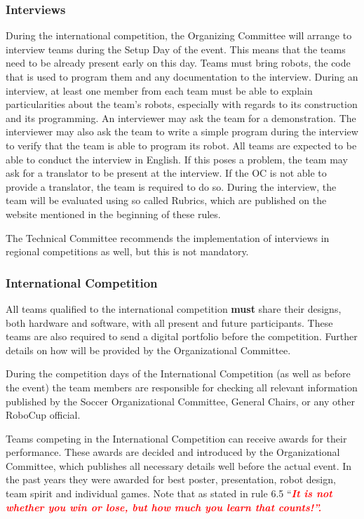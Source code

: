 \documentclass{article}
\begin{document}
\subsubsection{Interviews \label{ref-060}}

During the international competition, the Organizing Committee will arrange to interview teams during the Setup Day of the event. This means that the teams need to be already present early on this day. Teams must bring robots, the code that is used to program them and any documentation to the interview. During an interview, at least one member from each team must be able to explain particularities about the team's robots, especially with regards to its construction and its programming. An interviewer may ask the team for a demonstration. The interviewer may also ask the team to write a simple program during the interview to verify that the team is able to program its robot. All teams are expected to be able to conduct the interview in English. If this poses a problem, the team may ask for a translator to be present at the interview. If the OC is not able to provide a translator, the team is required to do so. During the interview, the team will be evaluated using so called Rubrics, which are published on the website mentioned in the beginning of these rules.

The Technical Committee recommends the implementation of interviews in regional competitions as well, but this is not mandatory.

\subsubsection{International Competition \label{ref-061}}

All teams qualified to the international competition \textbf{must} share their designs, both hardware and software, with all present and future participants. These teams are also required to send a digital portfolio before the competition. Further details on how will be provided by the Organizational Committee.

During the competition days of the International Competition (as well as before the event) the team members are responsible for checking all relevant information published by the Soccer Organizational Committee, General Chairs, or any other RoboCup official.

Teams competing in the International Competition can receive awards for their performance. These awards are decided and introduced by the Organizational Committee, which publishes all necessary details well before the actual event. In the past years they were awarded for best poster, presentation, robot design, team spirit and individual games. Note that as stated in rule 6.5 ``\textbf{\textit{\textcolor{red}{It is not whether you win or lose, but how much you learn that counts!''.}}}
\end{document}
